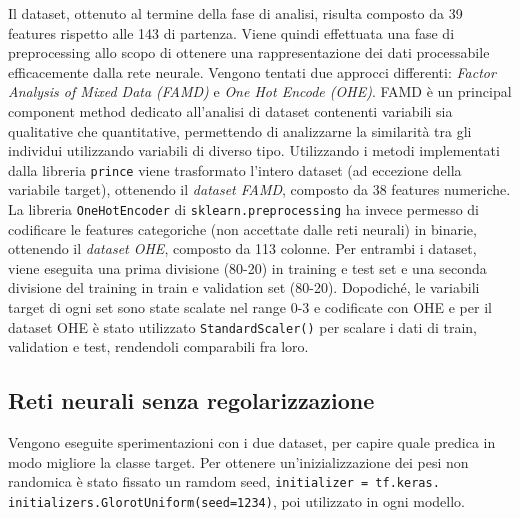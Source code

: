 Il dataset, ottenuto al termine della fase di analisi, risulta composto da 39 features rispetto alle 143 di partenza.
Viene quindi effettuata una fase di preprocessing allo scopo di ottenere una rappresentazione dei dati processabile efficacemente dalla rete neurale. Vengono tentati due approcci differenti: \textit{Factor Analysis of Mixed Data (FAMD)} \cite{famd} e  \textit{One Hot Encode (OHE)}. 
FAMD è un principal component method dedicato all'analisi di dataset contenenti variabili sia qualitative che quantitative, permettendo di analizzarne la similarità tra gli individui utilizzando variabili di diverso tipo.
Utilizzando i metodi implementati dalla libreria \texttt{prince} viene trasformato l'intero dataset (ad eccezione della variabile target), ottenendo il \textit{dataset FAMD}, composto da 38 features numeriche.
La libreria \texttt{OneHotEncoder} di \texttt{sklearn.preprocessing} ha invece permesso di codificare le features categoriche (non accettate dalle reti neurali) in binarie, ottenendo il \textit{dataset OHE}, composto da 113 colonne.
Per entrambi i dataset, viene eseguita una prima divisione (80-20) in training e test set e una seconda divisione del training in train e validation set (80-20). 
Dopodiché, le variabili target di ogni set sono state scalate nel range 0-3 e codificate con OHE e per il dataset OHE è stato utilizzato \texttt{StandardScaler()} per scalare i dati di train, validation e test, rendendoli comparabili fra loro.


\subsection{Reti neurali senza regolarizzazione}
Vengono eseguite sperimentazioni con i due dataset, per capire quale predica in modo migliore la classe target.
Per ottenere un'inizializzazione dei pesi non randomica è stato fissato un ramdom seed, \texttt{initializer = tf.keras. initializers.GlorotUniform(seed=1234)}, poi utilizzato in ogni modello. 


